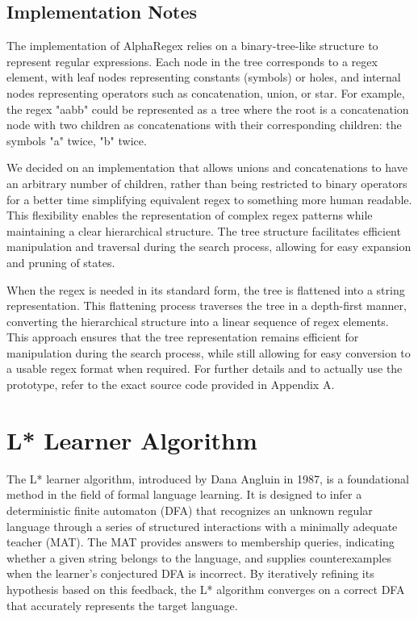 \subsection{Implementation Notes}
\indent\indent The implementation of AlphaRegex relies on a binary-tree-like structure to represent regular expressions. Each node in the tree corresponds to a regex element, with leaf nodes representing constants (symbols) or holes, and internal nodes representing operators such as concatenation, union, or star. For example, the regex "aabb" could be represented as a tree where the root is a concatenation node with two children as concatenations with their corresponding children: the symbols "a" twice, "b" twice.

\indent\indent We decided on an implementation that allows unions and concatenations to have an arbitrary number of children, rather than being restricted to binary operators for a better time simplifying equivalent regex to something more human readable. This flexibility enables the representation of complex regex patterns while maintaining a clear hierarchical structure. The tree structure facilitates efficient manipulation and traversal during the search process, allowing for easy expansion and pruning of states.

\indent\indent When the regex is needed in its standard form, the tree is flattened into a string representation. This flattening process traverses the tree in a depth-first manner, converting the hierarchical structure into a linear sequence of regex elements. This approach ensures that the tree representation remains efficient for manipulation during the search process, while still allowing for easy conversion to a usable regex format when required. For further details and to actually use the prototype, refer to the exact source code provided in Appendix A.

\vspace{-0.4em}
\section{L* Learner Algorithm}
\vspace{-0.4em}

\indent\indent The L* learner algorithm, introduced by Dana Angluin in 1987, is a foundational method in the field of formal language learning. It is designed to infer a deterministic finite automaton (DFA) that recognizes an unknown regular language through a series of structured interactions with a minimally adequate teacher (MAT). The MAT provides answers to membership queries, indicating whether a given string belongs to the language, and supplies counterexamples when the learner's conjectured DFA is incorrect. By iteratively refining its hypothesis based on this feedback, the L* algorithm converges on a correct DFA that accurately represents the target language. \cite{angluin_1987_learning}

